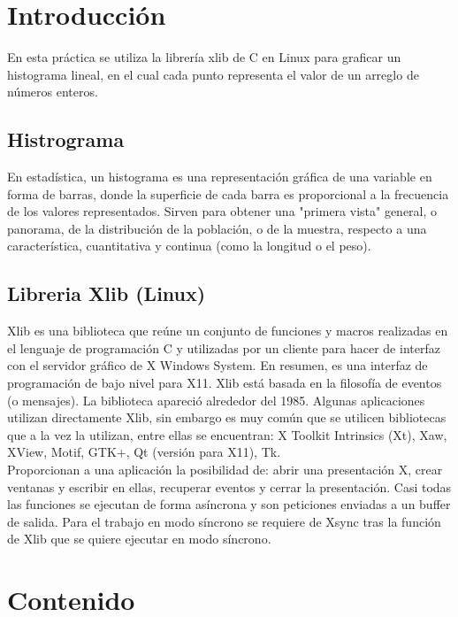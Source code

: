 \documentclass[11pt,letterpaper]{article}
\begin{document}


\section*{Introducción}
En esta práctica se utiliza la librería xlib de C en Linux para graficar un histograma lineal, en el cual cada punto representa el valor de un arreglo de números enteros.

\subsection*{Histrograma}
En estadística, un histograma es una representación gráfica de una variable en forma de barras, donde la superficie de cada barra es proporcional a la frecuencia de los valores representados. Sirven para obtener una "primera vista" general, o panorama, de la distribución de la población, o de la muestra, respecto a una característica, cuantitativa y continua (como la longitud o el peso).\\

\subsection*{Libreria Xlib (Linux)}
Xlib es una biblioteca que reúne un conjunto de funciones y macros realizadas en el lenguaje de programación C y utilizadas por un cliente para hacer de interfaz con el servidor gráfico de X Windows System.  En resumen, es una interfaz de programación de bajo nivel para X11. Xlib está basada en la filosofía de eventos (o mensajes). La biblioteca apareció alrededor del 1985. Algunas aplicaciones utilizan directamente Xlib, sin embargo es muy común que se utilicen bibliotecas que a la vez la utilizan, entre ellas se encuentran: X Toolkit Intrinsics (Xt), Xaw, XView, Motif, GTK+, Qt (versión para X11), Tk.\\


Proporcionan a una aplicación la posibilidad de: abrir una presentación X, crear ventanas y escribir en ellas, recuperar eventos y cerrar la presentación. Casi todas las funciones se ejecutan de forma asíncrona y son peticiones enviadas a un buffer de salida. Para el trabajo en modo síncrono se requiere de Xsync tras la función de Xlib que se quiere ejecutar en modo síncrono. 

\section*{Contenido}
\end{document}
